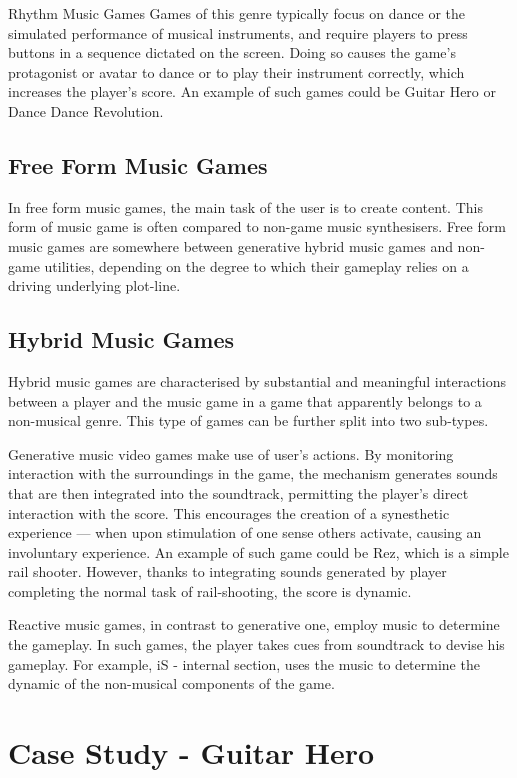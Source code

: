 Rhythm Music Games
Games of this genre typically focus on dance or the simulated performance of musical instruments, and require players to press buttons in a sequence dictated on the screen. Doing so causes the game's protagonist or avatar to dance or to play their instrument correctly, which increases the player's score. An example of such games could be Guitar Hero or Dance Dance Revolution.


\subsection{Free Form Music Games}

In free form music games, the main task of the user is to create content. This form of music game is often compared to non-game music synthesisers. Free form music games are somewhere between generative hybrid music games and non-game utilities, depending on the degree to which their gameplay relies on a driving underlying plot-line.


\subsection{Hybrid Music Games}

Hybrid music games are characterised by substantial and meaningful interactions between a player and the music game in a game that apparently belongs to a non-musical genre. This type of games can be further split into two sub-types.


Generative music video games make use of user’s actions. By monitoring interaction with the surroundings in the game, the mechanism generates sounds that are then integrated into the soundtrack, permitting the player’s direct interaction with the score. This encourages the creation of a synesthetic experience — when upon stimulation of one sense others activate, causing an involuntary experience. An example of such game could be Rez, which is a simple rail shooter. However, thanks to integrating sounds generated by player completing the normal task of rail-shooting, the score is dynamic.

Reactive music games, in contrast to generative one, employ music to determine the gameplay. In such games, the player takes cues from soundtrack to devise his gameplay. For example, iS - internal section, uses the music to determine the dynamic of the non-musical components of the game.


\section{Case Study - Guitar Hero}


